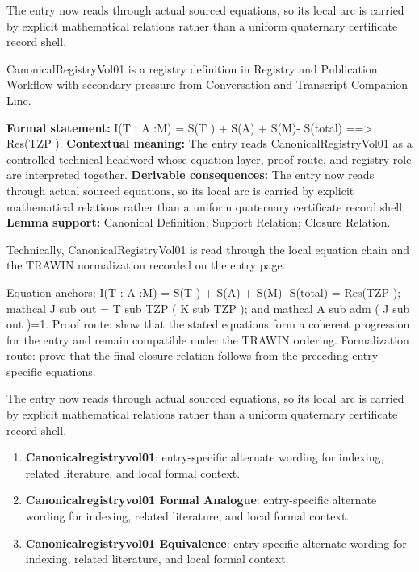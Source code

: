 The entry now reads through actual sourced equations, so its local arc is carried by explicit mathematical relations rather than a uniform quaternary certificate record shell.
\clearpage


\begingroup\small
{}
CanonicalRegistryVol01 is a registry definition in Registry and Publication Workflow with secondary pressure from Conversation and Transcript Companion Line.

\begingroup\footnotesize\setlength{\emergencystretch}{3em}\sloppy
\textbf{Formal statement:} I(T : A :M) = S(T ) + S(A) + S(M)- S(total) ==> Res(TZP ). \textbf{Contextual meaning:} The entry reads CanonicalRegistryVol01 as a controlled technical headword whose equation layer, proof route, and registry role are interpreted together. \textbf{Derivable consequences:} The entry now reads through actual sourced equations, so its local arc is carried by explicit mathematical relations rather than a uniform quaternary certificate record shell. \textbf{Lemma support:} Canonical Definition; Support Relation; Closure Relation.\par
\endgroup

Technically, CanonicalRegistryVol01 is read through the local equation chain and the TRAWIN normalization recorded on the entry page.

Equation anchors: I(T : A :M) = S(T ) + S(A) + S(M)- S(total) =  Res(TZP ); mathcal J sub out = T sub TZP ( K sub TZP ); and mathcal A sub adm ( J sub out )=1. Proof route: show that the stated equations form a coherent progression for the entry and remain compatible under the TRAWIN ordering. Formalization route: prove that the final closure relation follows from the preceding entry-specific equations.

The entry now reads through actual sourced equations, so its local arc is carried by explicit mathematical relations rather than a uniform quaternary certificate record shell.
\endgroup

\begin{enumerate}[leftmargin=1.6em,itemsep=6pt,topsep=4pt]
\item \textbf{Canonicalregistryvol01}: entry-specific alternate wording for indexing, related literature, and local formal context.
\item \textbf{Canonicalregistryvol01 Formal Analogue}: entry-specific alternate wording for indexing, related literature, and local formal context.
\item \textbf{Canonicalregistryvol01 Equivalence}: entry-specific alternate wording for indexing, related literature, and local formal context.
\end{enumerate}

